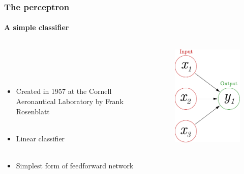 \documentclass{beamer}
\newcommand{\figheight}{0.72\textheight}
\begin{document}
\begin{frame}
\frametitle{The perceptron}
\framesubtitle{A simple classifier}
  \begin{columns}[T]
    \begin{column}{.45\textwidth}    \ \\ \ \\ 
    \ \\
    \begin{itemize}
    
 
     \item<2->Created in 1957 at the Cornell Aeronautical Laboratory by Frank Rosenblatt  \\ \
\item<3->Linear classifier \\ \

\item<4->Simplest form of feedforward network \\ \

\end{itemize}

    \end{column}
    \begin{column}{.55\textwidth}
\begin{figure}
  \begin{flushleft}

 \includegraphics[height = \figheight]{./fig/perceptron.pdf}
\end{flushleft}
\end{figure}
    \end{column}
  \end{columns}
\end{frame}
\end{document}
